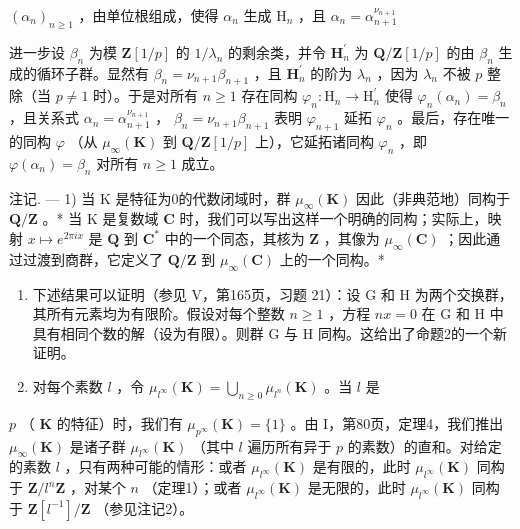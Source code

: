 \((\alpha_{n})_{n\geqslant 1}\) ，由单位根组成，使得 \(\alpha_{n}\) 生成 \(\mathrm{H}_n\) ，且 \(\alpha_{n} = \alpha_{n + 1}^{\nu_{n + 1}}\)

进一步设 \(\beta_{n}\) 为模 \(\mathbf{Z}[1/p]\) 的 \(1/\lambda_{n}\) 的剩余类，并令 \(\mathbf{H}_{n}^{\prime}\) 为 \(\mathbf{Q}/\mathbf{Z}[1/p]\) 的由 \(\beta_{n}\) 生成的循环子群。显然有 \(\beta_{n} = \nu_{n+1}\beta_{n+1}\) ，且 \(\mathbf{H}_{n}^{\prime}\) 的阶为 \(\lambda_{n}\) ，因为 \(\lambda_{n}\) 不被 \(p\) 整除（当 \(p \neq 1\) 时）。于是对所有 \(n \geqslant 1\) 存在同构 \(\varphi_{n}: \mathrm{H}_{n} \to \mathrm{H}_{n}^{\prime}\) 使得 \(\varphi_{n}(\alpha_{n}) = \beta_{n}\) ，且关系式 \(\alpha_{n} = \alpha_{n+1}^{\nu_{n+1}}\) ， \(\beta_{n} = \nu_{n+1}\beta_{n+1}\) 表明 \(\varphi_{n+1}\) 延拓 \(\varphi_{n}\) 。最后，存在唯一的同构 \(\varphi\) （从 \(\mu_{\infty}(\mathbf{K})\) 到 \(\mathbf{Q}/\mathbf{Z}[1/p]\) 上），它延拓诸同构 \(\varphi_{n}\) ，即 \(\varphi(\alpha_{n}) = \beta_{n}\) 对所有 \(n \geqslant 1\) 成立。

注记. --- 1) 当 K 是特征为0的代数闭域时，群 \(\mu_{\infty}(\mathbf{K})\) 因此（非典范地）同构于 \(\mathbf{Q}/\mathbf{Z}\) 。* 当 K 是复数域 \(\mathbf{C}\) 时，我们可以写出这样一个明确的同构；实际上，映射 \(x \mapsto e^{2\pi ix}\) 是 \(\mathbf{Q}\) 到 \(\mathbf{C}^*\) 中的一个同态，其核为 \(\mathbf{Z}\) ，其像为 \(\mu_{\infty}(\mathbf{C})\) ；因此通过过渡到商群，它定义了 \(\mathbf{Q}/\mathbf{Z}\) 到 \(\mu_{\infty}(\mathbf{C})\) 上的一个同构。*

\begin{enumerate}
\def\labelenumi{\arabic{enumi})}
\setcounter{enumi}{1}
\item
  下述结果可以证明（参见 V，第165页，习题 21）：设 G 和 H 为两个交换群，其所有元素均为有限阶。假设对每个整数 \(n \geqslant 1\) ，方程 \(nx = 0\) 在 G 和 H 中具有相同个数的解（设为有限）。则群 G 与 H 同构。这给出了命题2的一个新证明。
\item
  对每个素数 \(l\) ，令 \(\mu_{l^{\infty}}(\mathbf{K}) = \bigcup_{n\geqslant 0}\mu_{l^{n}}(\mathbf{K})\) 。当 \(l\) 是
\end{enumerate}

\(p\) （ \(\mathbf{K}\) 的特征）时，我们有 \(\mu_{p^{\infty}}(\mathbf{K}) = \{1\}\) 。由 I，第80页，定理4，我们推出 \(\mu_{\infty}(\mathbf{K})\) 是诸子群 \(\mu_{l^{\infty}}(\mathbf{K})\) （其中 \(l\) 遍历所有异于 \(p\) 的素数）的直和。对给定的素数 \(l\) ，只有两种可能的情形：或者 \(\mu_{l^{\infty}}(\mathbf{K})\) 是有限的，此时 \(\mu_{l^{\infty}}(\mathbf{K})\) 同构于 \(\mathbf{Z}/l^{n}\mathbf{Z}\) ，对某个 \(n\) （定理1）；或者 \(\mu_{l^{\infty}}(\mathbf{K})\) 是无限的，此时 \(\mu_{l^{\infty}}(\mathbf{K})\) 同构于 \(\mathbf{Z}[l^{-1}]/\mathbf{Z}\) （参见注记2）。

